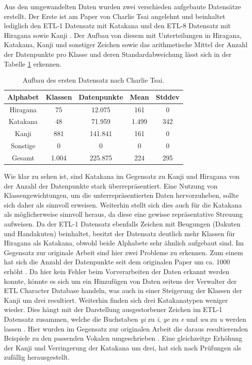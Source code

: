 \documentclass[twoside,a4paper]{IEEEtran}
\begin{document}
Aus den umgewandelten Daten wurden zwei verschieden aufgebaute Datensätze erstellt. Der Erste ist am Paper von Charlie Tsai angelehnt und beinhaltet lediglich den ETL-1 Datensatz mit Katakana und den ETL-8 Datensatz mit Hiragana sowie Kanji \cite[S.3]{RHC}. Der Aufbau von diesem mit Unterteilungen in Hiragana, Katakana, Kanji und sonstiger Zeichen sowie das arithmetische Mittel der Anzahl der Datenpunkte pro Klasse und deren Standardabweichung lässt sich in der Tabelle \ref{data_tsai} erkennen.
\begin{table}[!htb]
	\caption{Aufbau des ersten Datensatz nach Charlie Tsai.}
	\label{data_tsai}
	\centering
	\begin{tabular}{|c|c|c|c|c|}
		\hline
		Alphabet & Klassen & Datenpunkte & Mean & Stddev\\
		\hline
		\hline
		Hiragana & 75 & 12.075 & 161 & 0\\
		\hline 
		Katakana & 48 & 71.959 & 1.499 & 342\\
		\hline
		Kanji & 881 & 141.841 & 161 & 0\\
		\hline
		Sonstige & 0 & 0 & 0 & 0\\
		\hline
		\hline
		Gesamt & 1.004 & 225.875 & 224 & 295\\
		\hline
	\end{tabular}
\end{table}

Wie klar zu sehen ist, sind Katakana im Gegensatz zu Kanji und Hiragana von der Anzahl der Datenpunkte stark überrepräsentiert. Eine Nutzung von Klassengewichtungen, um die unterrepräsentierten Daten hervorzuheben, sollte sich daher als sinnvoll erweisen. Weiterhin stellt sich dies auch für die Katakana als möglicherweise sinnvoll heraus, da diese eine gewisse repräsentative Streuung aufweisen. Da der ETL-1 Datensatz ebenfalls Zeichen mit Beugungen (Dakuten und Handakuten) beinhaltet, besitzt der Datensatz deutlich mehr Klassen für Hiragana als Katakana, obwohl beide Alphabete sehr ähnlich aufgebaut sind. Im Gegensatz zur originale Arbeit sind hier zwei Probleme zu erkennen. Zum einem hat sich die Anzahl der Datenpunkte seit dem originalen Paper um ca. 1000 erhöht \cite[S.3]{RHC}. Da hier kein Fehler beim Vorverarbeiten der Daten erkannt werden konnte, könnte es sich um ein Hinzufügen von Daten seitens der Verwalter der ETL Character Database handeln, was auch in einer Steigerung der Klassen der Kanji um drei resultiert. Weiterhin finden sich drei Katakanatypen weniger wieder. Dies hängt mit der Darstellung ausgestorbener Zeichen im ETL-1 Datensatz zusammen, welche die Buchstaben \textit{yi} zu \textit{i}, \textit{ye} zu \textit{e} und \textit{wu} zu \textit{u} werden lassen \cite{ETL}. Hier wurden im Gegensatz zur originalen Arbeit die daraus resultierenden Beispiele zu den passenden Vokalen umgeschrieben \cite[S.3]{RHC}. Eine gleichzeitge Erhöhung der Kanji und Verringerung der Katakana um drei, hat sich nach Prüfungen als zufällig herausgestellt. 
\end{document}
